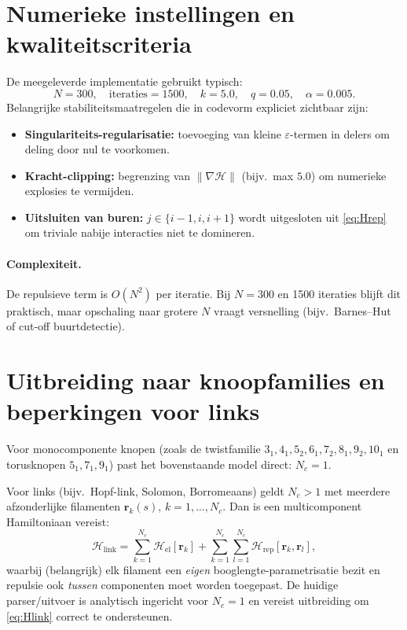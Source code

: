\documentclass[11pt]{article}
\begin{document}
        \section{Numerieke instellingen en kwaliteitscriteria}
        De meegeleverde implementatie gebruikt typisch:
        \[
            N=300,\quad \text{iteraties}=1500,\quad k=5.0,\quad q=0.05,\quad \alpha=0.005.
        \]
        Belangrijke stabiliteitsmaatregelen die in codevorm expliciet zichtbaar zijn:
        \begin{itemize}
            \item \textbf{Singulariteits-regularisatie:} toevoeging van kleine $\varepsilon$-termen in delers om deling door nul te voorkomen.
            \item \textbf{Kracht-clipping:} begrenzing van $\|\nabla \mathcal{H}\|$ (bijv.\ max $5.0$) om numerieke explosies te vermijden.
            \item \textbf{Uitsluiten van buren:} $j\in\{i-1,i,i+1\}$ wordt uitgesloten uit \eqref{eq:Hrep} om triviale nabije interacties niet te domineren.
        \end{itemize}

        \paragraph{Complexiteit.}
            De repulsieve term is $O(N^2)$ per iteratie. Bij $N=300$ en 1500 iteraties blijft dit praktisch, maar opschaling naar grotere $N$ vraagt versnelling (bijv.\ Barnes--Hut of cut-off buurtdetectie).

        \section{Uitbreiding naar knoopfamilies en beperkingen voor links}
        Voor monocomponente knopen (zoals de twistfamilie $3_1,4_1,5_2,6_1,7_2,8_1,9_2,10_1$ en torusknopen $5_1,7_1,9_1$) past het bovenstaande model direct: $N_c=1$.

        Voor links (bijv.\ Hopf-link, Solomon, Borromeaans) geldt $N_c>1$ met meerdere afzonderlijke filamenten $\mathbf{r}_k(s)$, $k=1,\dots,N_c$. Dan is een multicomponent Hamiltoniaan vereist:
        \begin{equation}
            \mathcal{H}_{\mathrm{link}}
            =\sum_{k=1}^{N_c}\mathcal{H}_{\mathrm{el}}[\mathbf{r}_k]
            +\sum_{k=1}^{N_c}\sum_{l=1}^{N_c}\mathcal{H}_{\mathrm{rep}}[\mathbf{r}_k,\mathbf{r}_l],
            \label{eq:Hlink}
        \end{equation}
        waarbij (belangrijk) elk filament een \emph{eigen} booglengte-parametrisatie bezit en repulsie ook \emph{tussen} componenten moet worden toegepast. De huidige parser/uitvoer is analytisch ingericht voor $N_c=1$ en vereist uitbreiding om \eqref{eq:Hlink} correct te ondersteunen.
\end{document}
